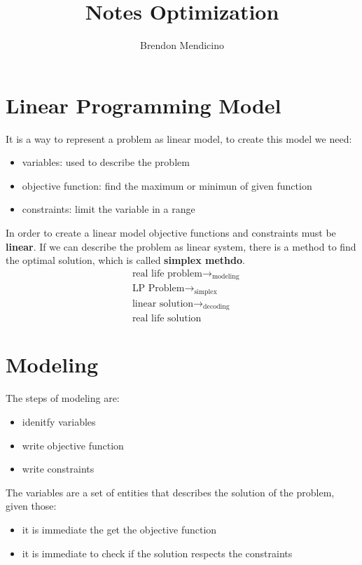 \documentclass[12pt]{article}
\title{Notes Optimization}
\author{Brendon Mendicino}
\begin{document}
\maketitle
\newpage
\tableofcontents
\newpage

\section{Linear Programming Model}
It is a way to represent a problem as linear model, to create this model we need:
\begin{itemize}
  \item variables: used to describe the problem
  \item objective function: find the maximum or minimun of given function
  \item constraints: limit the variable in a range
\end{itemize}
In order to create a linear model objective functions and constraints must be \textbf{linear}. If we can describe the problem as linear system, there is a method to find the optimal solution, which is called \textbf{simplex methdo}.
\begin{align*}
  & \text{real life problem} \longrightarrow_{\text{modeling}} \\
  & \text{LP Problem} \longrightarrow_{\text{simplex}} \\
  & \text{linear solution} \longrightarrow_{\text{decoding}} \\
  & \text{real life solution}
\end{align*} 

\newpage
\section{Modeling}
The steps of modeling are:
\begin{itemize}
  \item idenitfy variables
  \item write objective function
  \item write constraints
\end{itemize}
The variables are a set of entities that describes the solution of the problem, given those:
\begin{itemize}
  \item it is immediate the get the objective function 
  \item it is immediate to check if the solution respects the constraints
\end{itemize}
\end{document}

